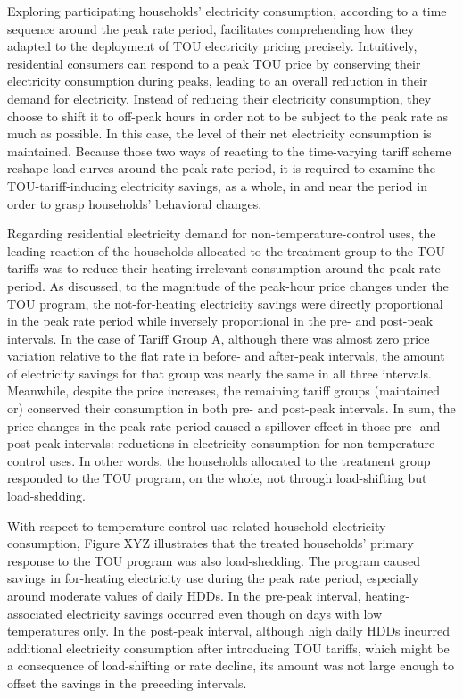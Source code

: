 Exploring participating households' electricity consumption, according to a time sequence around the peak rate period, facilitates comprehending how they adapted to the deployment of TOU electricity pricing precisely. Intuitively, residential consumers can respond to a peak TOU price by conserving their electricity consumption during peaks, leading to an overall reduction in their demand for electricity. Instead of reducing their electricity consumption, they choose to shift it to off-peak hours in order not to be subject to the peak rate as much as possible. In this case, the level of their net electricity consumption is maintained. Because those two ways of reacting to the time-varying tariff scheme reshape load curves around the peak rate period, it is required to examine the TOU-tariff-inducing electricity savings, as a whole, in and near the period in order to grasp households' behavioral changes. 

Regarding residential electricity demand for non-temperature-control uses, the leading reaction of the households allocated to the treatment group to the TOU tariffs was to reduce their heating-irrelevant consumption around the peak rate period. As discussed, to the magnitude of the peak-hour price changes under the TOU program, the not-for-heating electricity savings were directly proportional in the peak rate period while inversely proportional in the pre- and post-peak intervals. In the case of Tariff Group A, although there was almost zero price variation relative to the flat rate in before- and after-peak intervals, the amount of electricity savings for that group was nearly the same in all three intervals. Meanwhile, despite the price increases, the remaining tariff groups (maintained or) conserved their consumption in both pre- and post-peak intervals. In sum, the price changes in the peak rate period caused a spillover effect in those pre- and post-peak intervals: reductions in electricity consumption for non-temperature-control uses. In other words, the households allocated to the treatment group responded to the TOU program, on the whole, not through load-shifting but load-shedding. 

With respect to temperature-control-use-related household electricity consumption, Figure XYZ illustrates that the treated households' primary response to the TOU program was also load-shedding. The program caused savings in for-heating electricity use during the peak rate period, especially around moderate values of daily HDDs. In the pre-peak interval, heating-associated electricity savings occurred even though on days with low temperatures only. In the post-peak interval, although high daily HDDs incurred additional electricity consumption after introducing TOU tariffs, which might be a consequence of load-shifting or rate decline, its amount was not large enough to offset the savings in the preceding intervals.


